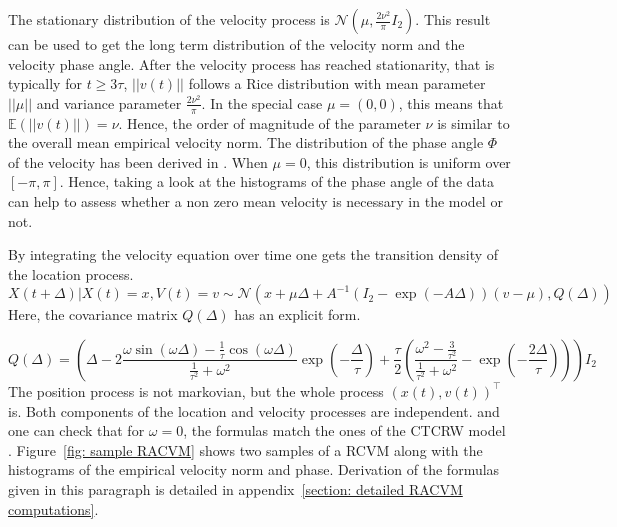 \documentclass[11pt]{article}
\newcommand {\E}{\mathbb{E}}
\newcommand {\1}{\mathbb{1}}
\begin{document}
The stationary distribution of the velocity process is $\mathcal{N}\left(\mu,\frac{2\nu^2}{\pi} I_2\right)$. This result can be used to get the long term distribution of the velocity norm and the velocity phase angle. After the velocity process has reached stationarity, that is typically for $t \geq 3\tau$, $\vert \vert v(t) \vert \vert$ follows a Rice distribution with mean parameter $\vert \vert \mu \vert \vert$ and variance parameter $\frac{2\nu^2}{\pi}$. In the special case $\mu=(0,0)$, this means that $\E(\vert \vert v(t) \vert \vert)=\nu$. Hence, the order of magnitude of the parameter $\nu$ is similar to the overall mean empirical velocity norm. The distribution of the phase angle $\Phi$ of the velocity has been derived in \cite{pawula_distribution_1982}.
When $\mu=0$, this distribution is uniform over $[-\pi,\pi]$. Hence, taking a look at the histograms of the phase angle of the data can help to assess whether a non zero mean velocity is necessary in the model or not.

By integrating the velocity equation over time one gets the transition density of the location process.
\begin{equation}
	X(t+\Delta) \vert X(t)=x, V(t)=v \sim \mathcal{N}\left(x+\mu \Delta+A^{-1} \left( I_2-\exp(-A\Delta)\right)(v-\mu),Q(\Delta)\right)  
\end{equation}
Here, the covariance matrix $Q(\Delta)$ has an explicit form.

\[
	Q(\Delta)=\left( \Delta-2 \frac{\omega \sin(\omega \Delta)-\frac{1}{\tau} \cos(\omega \Delta)}{\frac{1}{\tau^2}+\omega^2 } \exp\left( -\frac{\Delta}{\tau} \right) +\frac{\tau}{2} \left( \frac{\omega^2-\frac{3}{\tau^2}}{\frac{1}{\tau^2}+\omega^2}-\exp\left( -\frac{2\Delta}{\tau}\right)\right) \right) I_2
\]
The position process is not markovian, but the whole process $(x(t), v(t))^\top$ is.
Both components of the location and velocity processes are independent.
and one can check that for $\omega=0$, the formulas match the ones of the  CTCRW model \cite{johnson_continuoustime_2008}. Figure~\ref{fig: sample RACVM} shows two samples of a RCVM along with the histograms of the empirical velocity norm and phase. Derivation of the formulas given in this paragraph is detailed in appendix~\ref{section: detailed RACVM computations}.\\



\end{document}
